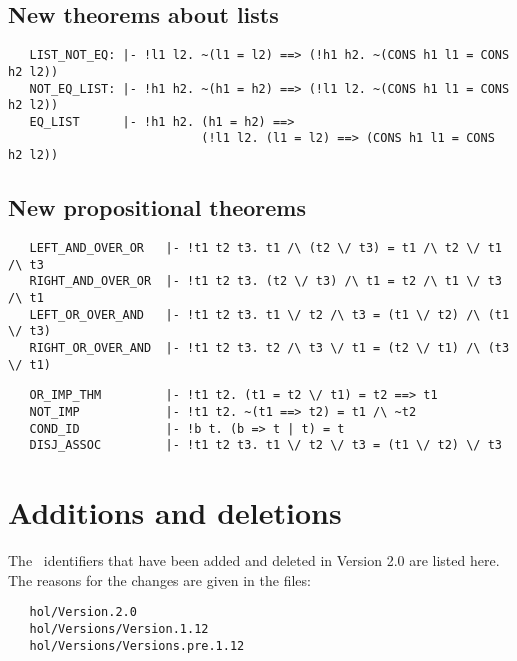 \subsection{New theorems about lists}

\begin{hol}\begin{verbatim}
   LIST_NOT_EQ: |- !l1 l2. ~(l1 = l2) ==> (!h1 h2. ~(CONS h1 l1 = CONS h2 l2))
   NOT_EQ_LIST: |- !h1 h2. ~(h1 = h2) ==> (!l1 l2. ~(CONS h1 l1 = CONS h2 l2))
   EQ_LIST      |- !h1 h2. (h1 = h2) ==>
                           (!l1 l2. (l1 = l2) ==> (CONS h1 l1 = CONS h2 l2))
\end{verbatim}\end{hol}

\subsection{New propositional theorems}

\begin{hol}\begin{verbatim}
   LEFT_AND_OVER_OR   |- !t1 t2 t3. t1 /\ (t2 \/ t3) = t1 /\ t2 \/ t1 /\ t3
   RIGHT_AND_OVER_OR  |- !t1 t2 t3. (t2 \/ t3) /\ t1 = t2 /\ t1 \/ t3 /\ t1
   LEFT_OR_OVER_AND   |- !t1 t2 t3. t1 \/ t2 /\ t3 = (t1 \/ t2) /\ (t1 \/ t3)
   RIGHT_OR_OVER_AND  |- !t1 t2 t3. t2 /\ t3 \/ t1 = (t2 \/ t1) /\ (t3 \/ t1)
\end{verbatim}\end{hol}
\begin{hol}\begin{verbatim}
   OR_IMP_THM         |- !t1 t2. (t1 = t2 \/ t1) = t2 ==> t1
   NOT_IMP            |- !t1 t2. ~(t1 ==> t2) = t1 /\ ~t2
   COND_ID            |- !b t. (b => t | t) = t
   DISJ_ASSOC         |- !t1 t2 t3. t1 \/ t2 \/ t3 = (t1 \/ t2) \/ t3
\end{verbatim}\end{hol}


\section{Additions and deletions}\label{adddel}

The \ML\ identifiers that have been added and deleted in Version 2.0
are listed here. The reasons for the changes are given in the files:

\begin{hol}\begin{verbatim}
   hol/Version.2.0
   hol/Versions/Version.1.12
   hol/Versions/Versions.pre.1.12
\end{verbatim}\end{hol}

